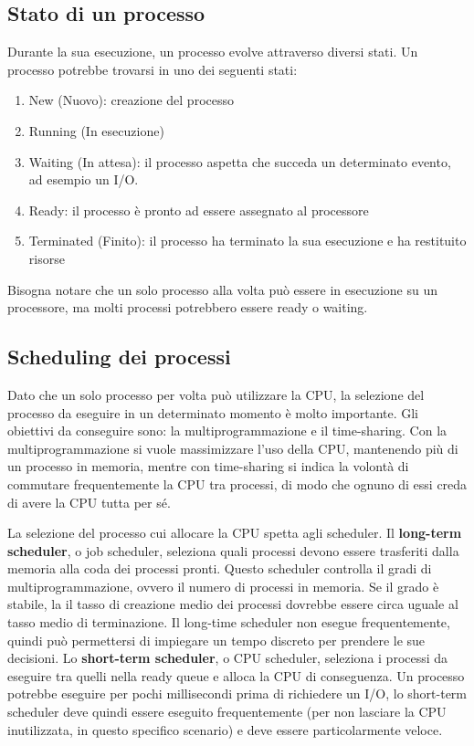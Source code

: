 \documentclass[a4paper]{article}
\begin{document}
\subsection{Stato di un processo}
Durante la sua esecuzione, un processo evolve attraverso diversi stati. Un processo potrebbe trovarsi in uno dei seguenti stati:
\begin{enumerate}
   \item New (Nuovo): creazione del processo
   \item Running (In esecuzione)
   \item Waiting (In attesa): il processo aspetta che succeda un determinato evento, ad esempio un I/O.
   \item Ready: il processo è pronto ad essere assegnato al processore
   \item Terminated (Finito): il processo ha terminato la sua esecuzione e ha restituito risorse
\end{enumerate}

Bisogna notare che un solo processo alla volta può essere in esecuzione su un processore, ma molti processi potrebbero essere ready o waiting.

\subsection{Scheduling dei processi}
Dato che un solo processo per volta può utilizzare la CPU, la selezione del processo da eseguire in un determinato momento è molto importante. Gli obiettivi da conseguire sono: la multiprogrammazione e il time-sharing. Con la multiprogrammazione si vuole massimizzare l'uso della CPU, mantenendo più di un processo in memoria, mentre con time-sharing si indica la volontà di commutare frequentemente la CPU tra processi, di modo che ognuno di essi creda di avere la CPU tutta per sé.

La selezione del processo cui allocare la CPU spetta agli scheduler. \newline
Il \textbf{long-term scheduler}, o job scheduler, seleziona quali processi devono essere trasferiti dalla memoria alla coda dei processi pronti. Questo scheduler controlla il gradi di multiprogrammazione, ovvero il numero di processi in memoria. Se il grado è stabile, la il tasso di creazione medio dei processi dovrebbe essere circa uguale al tasso medio di terminazione. Il long-time scheduler non esegue frequentemente, quindi può permettersi di impiegare un tempo discreto per prendere le sue decisioni. Lo \textbf{short-term scheduler}, o CPU scheduler, seleziona i processi da eseguire tra quelli nella ready queue e alloca la CPU di conseguenza. Un processo potrebbe eseguire per pochi millisecondi prima di richiedere un I/O, lo short-term scheduler deve quindi essere eseguito frequentemente (per non lasciare la CPU inutilizzata, in questo specifico scenario) e deve essere particolarmente veloce.
\end{document}
